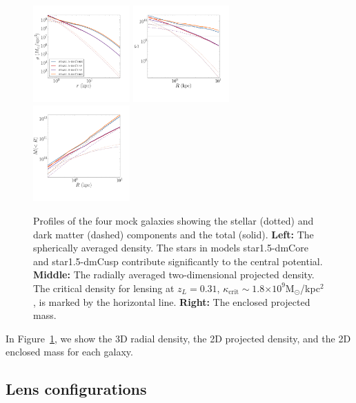 \documentclass[galley,usenatbib]{mn2e}
\newcommand{\Msun}{\ensuremath{\mathrm{M}_\odot}}
\newcommand{\figref}[1] {Figure~\ref{#1}}
\newcommand{\e}[1]{\ensuremath{\times 10^{#1}}}
\newcommand{\mockBB}{{\sc star1.5-dmCore}}
\newcommand{\mockBC}{{\sc star1.5-dmCusp}}
\begin{document}
\begin{figure}
\includegraphics[width=0.33\textwidth]{MockGalProfile-a.pdf} 
\includegraphics[width=0.33\textwidth]{MockGalProfile-b.pdf} 
\includegraphics[width=0.33\textwidth]{MockGalProfile-c.pdf}
\caption{
Profiles of the four mock galaxies showing the stellar (dotted) and dark matter (dashed) components and the total (solid).
\textbf{Left:} 
The spherically averaged density. The stars in models \mockBB{} and \mockBC{} contribute significantly to the central potential. 
\textbf{Middle:} 
The radially averaged two-dimensional projected density.
The critical density for lensing at $z_L=0.31$, $\kappa_\mathrm{crit}\sim 1.8\e{9}$\Msun/kpc$^2$, is marked by the horizontal line. 
\textbf{Right:}
The enclosed projected mass.
}
\label{mock galaxies}
\end{figure}

In \figref{mock galaxies}, we show the 3D radial density, 
the 2D projected density, and the 2D enclosed mass for each
galaxy.

\subsection{Lens configurations}\label{sec:lensconfig}
\end{document}
